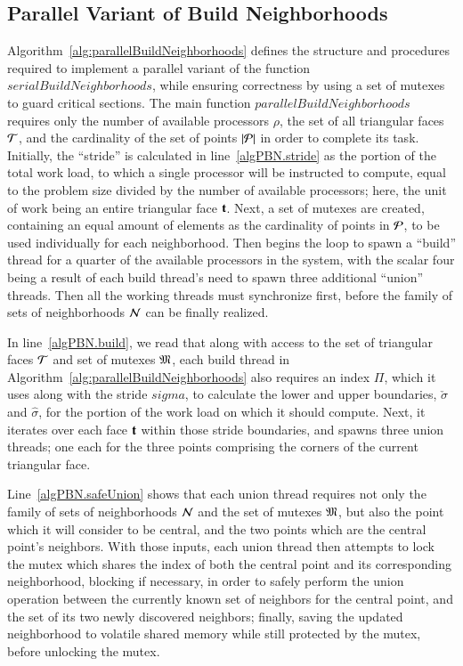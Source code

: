 \subsection{Parallel Variant of Build Neighborhoods}
\label{ch5sBNPssPVBN}
Algorithm~\ref{alg:parallelBuildNeighborhoods} defines the structure and procedures required to implement a parallel variant of the function $\mathit{serialBuildNeighborhoods}$, while ensuring correctness by using a set of mutexes to guard critical sections. The main function $\mathit{parallelBuildNeighborhoods}$ requires only the number of available processors $\rho$, the set of all triangular faces $\mathcal{T}$, and the cardinality of the set of points $|\mathcal{P}|$ in order to complete its task. Initially, the ``\gls{stride}'' is calculated in line~\ref{algPBN.stride} as the portion of the total work load, to which a single processor will be instructed to compute, equal to the problem size divided by the number of available processors; here, the unit of work being an entire triangular face $\mathbf{t}$. Next, a set of mutexes are created, containing an equal amount of elements as the cardinality of points in $\mathcal{P}$, to be used individually for each neighborhood.  Then begins the loop to spawn a ``build'' thread for a quarter of the available processors in the system, with the scalar four being a result of each build thread's need to spawn three additional ``union'' threads. Then all the working threads must synchronize first, before the family of sets of neighborhoods $\mathcal{N}$ can be finally realized.

In line~\ref{algPBN.build}, we read that along with access to the set of triangular faces $\mathcal{T}$ and set of mutexes $\mathfrak{M}$, each build thread in Algorithm~\ref{alg:parallelBuildNeighborhoods} also requires an index $\Pi$, which it uses along with the stride $sigma$, to calculate the lower and upper boundaries, $\check{\sigma}$ and $\hat{\sigma}$, for the portion of the work load on which it should compute. Next, it iterates over each face $\mathbf{t}$ within those stride boundaries, and spawns three union threads; one each for the three points comprising the corners of the current triangular face.

Line~\ref{algPBN.safeUnion} shows that each union thread requires not only the family of sets of neighborhoods $\mathcal{N}$ and the set of mutexes $\mathfrak{M}$, but also the point which it will consider to be central, and the two points which are the central point's neighbors. With those inputs, each union thread then attempts to lock the mutex which shares the index of both the central point and its corresponding neighborhood, blocking if necessary, in order to safely perform the union operation between the currently known set of neighbors for the central point, and the set of its two newly discovered neighbors; finally, saving the updated neighborhood to volatile shared memory while still protected by the mutex, before unlocking the mutex.

